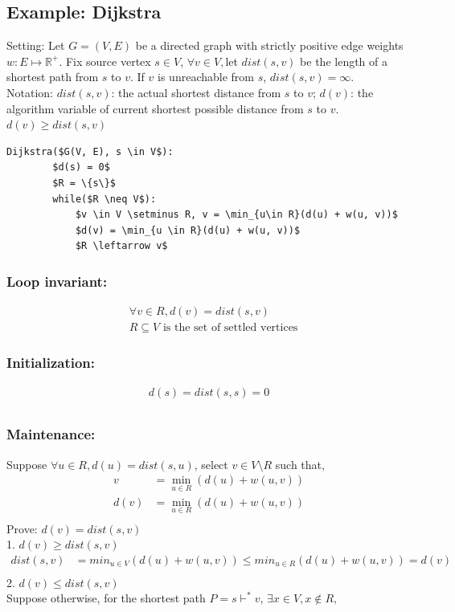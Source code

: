 \documentclass[9pt]{extarticle}
\begin{document}
\subsection{Example: Dijkstra}
Setting: Let $G = (V, E)$ be a directed graph with strictly positive edge weights $w : E \mapsto \mathbb{R}^+.$ Fix source vertex $s \in V$, 
$\forall v \in V, $let $dist(s, v)$ be the length of a shortest path from $s$ to $v$. If $v$ is unreachable from $s$, $dist(s,v) = \infty$.\\
Notation: $dist(s, v)$: the actual shortest distance from $s$ to $v$; $d(v)$: the algorithm variable of current shortest possible distance from $s$ to $v$. $d(v) \geq dist(s, v)$
\begin{lstlisting}[mathescape=true]
    Dijkstra($G(V, E), s \in V$):
        $d(s) = 0$
        $R = \{s\}$
        while($R \neq V$):
            $v \in V \setminus R, v = \min_{u\in R}(d(u) + w(u, v))$
            $d(v) = \min_{u \in R}(d(u) + w(u, v))$
            $R \leftarrow v$
\end{lstlisting}
\subsubsection*{Loop invariant: }
\begin{align*}
    &\forall v \in R, d(v) = dist(s, v)\\
    & R \subseteq V \text{ is the set of settled vertices}
\end{align*}
\subsubsection*{Initialization:}
\begin{align*}
    d(s) = dist(s, s) = 0\\
\end{align*}
\subsubsection*{Maintenance:}
Suppose $\forall u \in R, d(u) = dist(s, u)$, select $v \in V \setminus R$ such that, 
\begin{align*}
    v &= \min_{u \in R} (d(u) + w(u, v))\\
    d(v) &= \min_{u \in R}(d(u) + w(u,v))\\
\end{align*}
Prove: $d(v) = dist(s, v)$ \\
1. $d(v) \geq dist(s,v)$
\begin{align*}
    dist(s, v) &= min_{u \in V}(d(u) + w(u,v)) \leq min_{u \in R}(d(u) + w(u,v))= d(v)\\
\end{align*} 
2. $d(v) \leq dist(s,v)$\\
Suppose otherwise, for the shortest path $P = s \vdash ^* v$, $\exists x \in V, x\notin R, $
\end{document}

